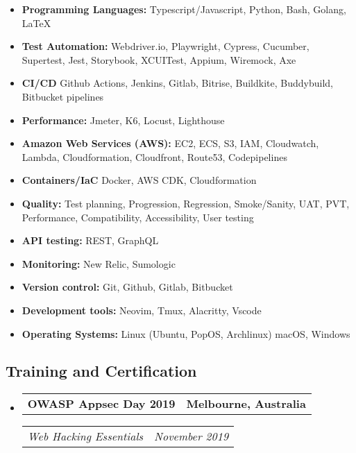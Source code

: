 \documentclass[11pt,letterpaper]{article}
\makeatletter
\newcommand{\headerrow}[2]
{\begin{tabular*}{\linewidth}{l@{\extracolsep{\fill}}r}
#1 &
#2 \\
\end{tabular*}}
\makeatother
\begin{document}
\begin{itemize}[leftmargin=1em,noitemsep]
	\item \textbf{Programming Languages:}
	      Typescript/Javascript, Python, Bash, Golang, \LaTeX
	\item \textbf{Test Automation:}
	    Webdriver.io, Playwright, Cypress, Cucumber, Supertest, Jest, Storybook, XCUITest, Appium,  Wiremock, Axe
	\item \textbf{CI/CD} 
        Github Actions, Jenkins, Gitlab, Bitrise, Buildkite, Buddybuild, Bitbucket pipelines
	\item \textbf{Performance:} 
        Jmeter, K6, Locust, Lighthouse
    \item \textbf{Amazon Web Services (AWS):} 
        EC2, ECS, S3, IAM, Cloudwatch, Lambda, Cloudformation, Cloudfront, Route53, Codepipelines
    \item \textbf{Containers/IaC}
        Docker, AWS CDK, Cloudformation
    \item \textbf{Quality:}
        Test planning, Progression, Regression, Smoke/Sanity, UAT, PVT, Performance, Compatibility, Accessibility, User testing
    \item \textbf{API testing:} 
        REST, GraphQL
    \item \textbf{Monitoring:} New Relic, Sumologic
    \item \textbf{Version control:} 
        Git, Github, Gitlab, Bitbucket
    \item \textbf{Development tools:}
        Neovim, Tmux, Alacritty, Vscode
    \item \textbf{Operating Systems:} 
        Linux (Ubuntu, PopOS, Archlinux) macOS, Windows
\end{itemize}
\vspace{2cm}
\vspace{-1em}
\subsection*{\Large Training and Certification}

\begin{itemize}[leftmargin=1em]
	\parskip=0.1em
		
	\item
	      \headerrow
	      {\textbf{OWASP Appsec Day 2019}}
	      {\textbf{Melbourne, Australia}}
	      \headerrow
	      {\emph{Web Hacking Essentials}}
	      {\emph{November 2019}}
	      	      
\end{itemize}
\end{document}
